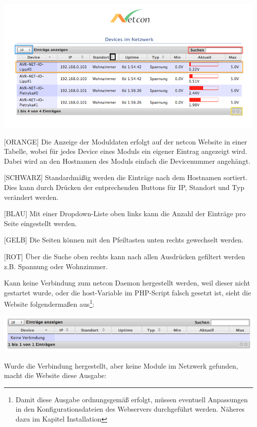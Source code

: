 \documentclass[a4paper,14pt,headsepline]{scrartcl}
\begin{document}
\includegraphics[width=0.85 \paperwidth]{./bilder/website2.png}

[ORANGE] Die Anzeige der Moduldaten erfolgt auf der netcon Website in einer Tabelle, wobei für jedes Device eines Moduls ein eigener Eintrag angezeigt wird. Dabei wird an den Hostnamen des Moduls einfach die Devicenummer angehängt.
 
[SCHWARZ] Standardmäßig werden die Einträge nach dem Hostnamen sortiert. Dies kann durch Drücken der entprechenden Buttons für IP, Standort und Typ verändert werden.  
 
\newpage
 
[BLAU] Mit einer Dropdown-Liste oben links kann die Anzahl der Einträge pro Seite eingestellt werden.
 
[GELB] Die Seiten können mit den Pfeiltasten unten rechts gewechselt werden.
 
[ROT] Über die Suche oben rechts kann nach allen Ausdrücken gefiltert werden z.B. Spannung oder Wohnzimmer.   
 
Kann keine Verbindung zum netcon Daemon hergestellt werden, weil dieser nicht gestartet wurde, oder die host-Variable im PHP-Script falsch gesetzt ist, sieht die Website folgendermaßen aus\footnote{Damit diese Ausgabe ordnungsgemäß erfolgt, müssen eventuell Anpassungen in den Konfigurationsdateien des Webservers durchgeführt werden. Näheres dazu im Kapitel Installation}:
 
\includegraphics[width=0.85 \paperwidth]{./bilder/no_connection.png}

Wurde die Verbindung hergestellt, aber keine Module im Netzwerk gefunden, macht die Website diese Ausgabe: 
\end{document}
